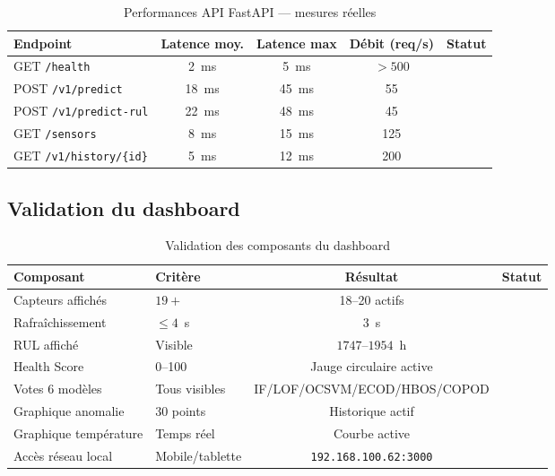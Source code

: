 \documentclass[12pt,a4paper]{report}
\newcommand{\cmark}{\ding{51}}
\begin{document}
\begin{table}[h]
\centering
\caption{Performances API FastAPI — mesures réelles}
\begin{tabular}{lcccc}
\toprule
\textbf{Endpoint} & \textbf{Latence moy.} & \textbf{Latence max} & \textbf{Débit (req/s)} & \textbf{Statut} \\
\midrule
GET  \texttt{/health}           & 2~ms  & 5~ms  & $> 500$ & \cmark \\
POST \texttt{/v1/predict}        & 18~ms & 45~ms & 55      & \cmark \\
POST \texttt{/v1/predict-rul}    & 22~ms & 48~ms & 45      & \cmark \\
GET  \texttt{/sensors}           & 8~ms  & 15~ms & 125     & \cmark \\
GET  \texttt{/v1/history/\{id\}} & 5~ms  & 12~ms & 200     & \cmark \\
\bottomrule
\end{tabular}
\end{table}

\subsection{Validation du dashboard}

\begin{table}[h]
\centering
\caption{Validation des composants du dashboard}
\begin{tabular}{llcc}
\toprule
\textbf{Composant} & \textbf{Critère} & \textbf{Résultat} & \textbf{Statut} \\
\midrule
Capteurs affichés       & $19+$          & 18--20 actifs            & \cmark \\
Rafraîchissement        & $\leq 4$~s     & 3~s                      & \cmark \\
RUL affiché             & Visible        & $1747$--$1954$~h         & \cmark \\
Health Score            & 0--100         & Jauge circulaire active  & \cmark \\
Votes 6 modèles         & Tous visibles  & IF/LOF/OCSVM/ECOD/HBOS/COPOD & \cmark \\
Graphique anomalie      & 30 points      & Historique actif         & \cmark \\
Graphique température   & Temps réel     & Courbe active            & \cmark \\
Accès réseau local      & Mobile/tablette & \texttt{192.168.100.62:3000} & \cmark \\
\bottomrule
\end{tabular}
\end{table}
\end{document}
